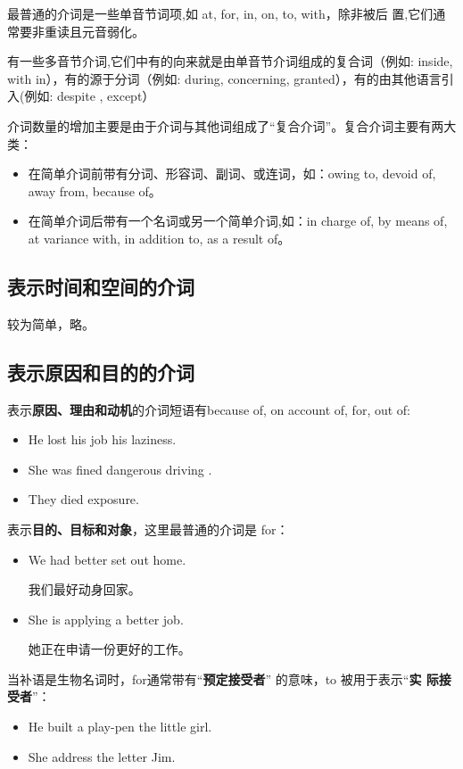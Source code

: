 最普通的介词是一些单音节词项,如 at, for, in, on, to, with，除非被后
置,它们通常要非重读且元音弱化。

有一些多音节介词,它们中有的向来就是由单音节介词组成的复合词（例如: inside,
with in），有的源于分词（例如: during, concerning, granted），有的由其他语言引
入(例如: despite , except）

介词数量的增加主要是由于介词与其他词组成了“复合介词”。复合介词主要有两大类：
\begin{itemize}
\item 在简单介词前带有分词、形容词、副词、或连词，如：owing to, devoid of, away
  from, because of。
\item 在简单介词后带有一个名词或另一个简单介词,如：in charge of, by means of,
  at variance with, in addition to, as a result of。
\end{itemize}

\subsection{表示时间和空间的介词}

较为简单，略。

\subsection{表示原因和目的的介词}

表示\textbf{原因、理由和动机}的介词短语有because of, on account of, for, out of:
\begin{itemize}
\item He lost his job  his laziness.
\item She was fined  dangerous driving .
\item They died  exposure.
\end{itemize}

表示\textbf{目的、目标和对象}，这里最普通的介词是 for：
\begin{itemize}
\item We had better set out  home.

  我们最好动身回家。

\item She is applying  a better job.

  她正在申请一份更好的工作。
\end{itemize}
当补语是生物名词时，for通常带有“\textbf{预定接受者}” 的意味，to 被用于表示“\textbf{实
  际接受者}”：
\begin{itemize}
\item He built a play-pen  the little girl.

\item She address the letter  Jim.
\end{itemize}

